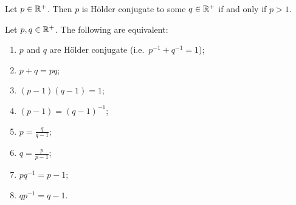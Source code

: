 \begin{lemma}
Let $p\in \mathbb{R}^+$. Then $p$ is Hölder conjugate to some $q\in \mathbb{R}^+$ \textup{if and only if} $p > 1$.
\end{lemma}

\begin{lemma} \label{HoelderConjugateEquivalents}
Let $p,q\in \mathbb{R}^+$. The following are equivalent:
\begin{enumerate}
\item $p$ and $q$ are Hölder conjugate (i.e.\ $p^{-1}+q^{-1} = 1$);
\item $p+q = pq$;
\item $(p-1)(q-1) = 1$;
\item $(p-1) = (q-1)^{-1}$;
\item $p = \frac{q}{q-1}$;
\item $q = \frac{p}{p-1}$;
\item $pq^{-1} = p-1$;
\item $qp^{-1} = q-1$.
\end{enumerate}
\end{lemma}

